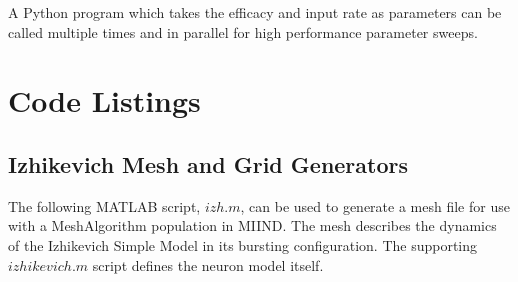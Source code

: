 \documentclass[utf8]{frontiers_suppmat} %
\begin{document}
A Python program which takes the efficacy and input rate as parameters can be called multiple times and in parallel for high performance parameter sweeps.

\section{Code Listings}

\subsection{Izhikevich Mesh and Grid Generators}
\label{izhmesh}
The following MATLAB script, $izh.m$, can be used to generate a mesh file for use with a MeshAlgorithm population in MIIND. The mesh describes the dynamics of the Izhikevich Simple Model \citep{izhikevich2003simple} in its bursting configuration. The supporting $izhikevich.m$ script defines the neuron model itself. \\
\end{document}
